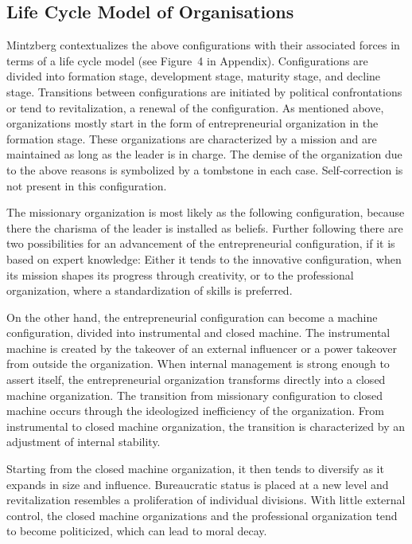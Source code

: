 \documentclass[a4paper,12pt]{article}
\begin{document}
\subsection{Life Cycle Model of Organisations}

Mintzberg contextualizes the above configurations with their associated forces
in terms of a life cycle model (see Figure~4 in Appendix). Configurations are
divided into formation stage, development stage, maturity stage, and decline
stage. Transitions between configurations are initiated by political
confrontations or tend to revitalization, a renewal of the configuration. As
mentioned above, organizations mostly start in the form of entrepreneurial
organization in the formation stage. These organizations are characterized by
a mission and are maintained as long as the leader is in charge. The demise of
the organization due to the above reasons is symbolized by a tombstone in each
case. Self-correction is not present in this configuration.

The missionary organization is most likely as the following configuration,
because there the charisma of the leader is installed as beliefs. Further
following there are two possibilities for an advancement of the
entrepreneurial configuration, if it is based on expert knowledge: Either it
tends to the innovative configuration, when its mission shapes its progress
through creativity, or to the professional organization, where a
standardization of skills is preferred.

On the other hand, the entrepreneurial configuration can become a machine
configuration, divided into instrumental and closed machine. The instrumental
machine is created by the takeover of an external influencer or a power
takeover from outside the organization. When internal management is strong
enough to assert itself, the entrepreneurial organization transforms directly
into a closed machine organization. The transition from missionary
configuration to closed machine occurs through the ideologized inefficiency of
the organization. From instrumental to closed machine organization, the
transition is characterized by an adjustment of internal stability.

Starting from the closed machine organization, it then tends to diversify as
it expands in size and influence. Bureaucratic status is placed at a new level
and revitalization resembles a proliferation of individual divisions. With
little external control, the closed machine organizations and the professional
organization tend to become politicized, which can lead to moral decay.
\end{document}
